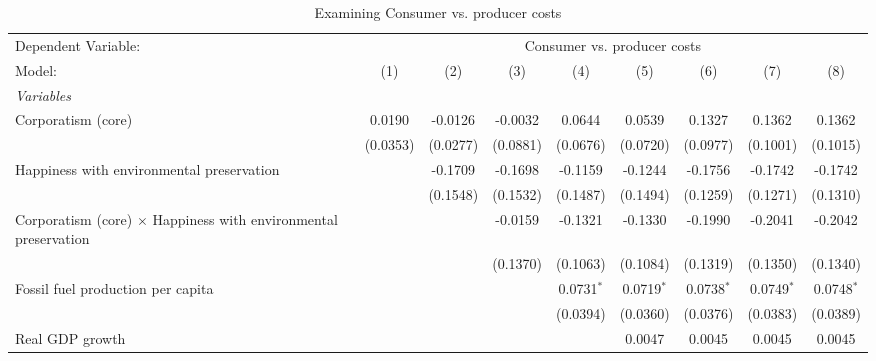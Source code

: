 
\begin{table}[htbp]
   \caption{Examining Consumer vs. producer costs}
   \centering
   \begin{tabular}{lcccccccc}
      \tabularnewline \midrule \midrule
      Dependent Variable: & \multicolumn{8}{c}{Consumer vs. producer costs}\\
      Model:                                                                 & (1)      & (2)      & (3)      & (4)          & (5)          & (6)          & (7)          & (8)\\  
      \midrule
      \emph{Variables}\\
      Corporatism (core)                                                     & 0.0190   & -0.0126  & -0.0032  & 0.0644       & 0.0539       & 0.1327       & 0.1362       & 0.1362\\   
                                                                             & (0.0353) & (0.0277) & (0.0881) & (0.0676)     & (0.0720)     & (0.0977)     & (0.1001)     & (0.1015)\\   
      Happiness with environmental preservation                              &          & -0.1709  & -0.1698  & -0.1159      & -0.1244      & -0.1756      & -0.1742      & -0.1742\\   
                                                                             &          & (0.1548) & (0.1532) & (0.1487)     & (0.1494)     & (0.1259)     & (0.1271)     & (0.1310)\\   
      Corporatism (core) $\times$ Happiness with environmental preservation  &          &          & -0.0159  & -0.1321      & -0.1330      & -0.1990      & -0.2041      & -0.2042\\   
                                                                             &          &          & (0.1370) & (0.1063)     & (0.1084)     & (0.1319)     & (0.1350)     & (0.1340)\\   
      Fossil fuel production per capita                                      &          &          &          & 0.0731$^{*}$ & 0.0719$^{*}$ & 0.0738$^{*}$ & 0.0749$^{*}$ & 0.0748$^{*}$\\   
                                                                             &          &          &          & (0.0394)     & (0.0360)     & (0.0376)     & (0.0383)     & (0.0389)\\   
      Real GDP growth                                                        &          &          &          &              & 0.0047       & 0.0045       & 0.0045       & 0.0045\\   

\end{tabular}
\end{table}

